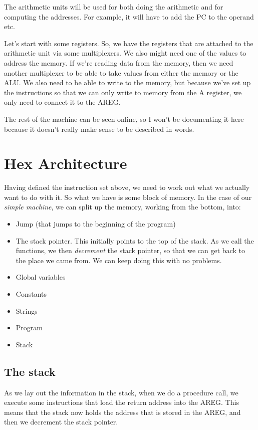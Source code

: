 \documentclass[11pt,a4paper,titlepage,dvipsnames,cmyk]{scrartcl}
\begin{document}
The arithmetic units will be used for both doing the arithmetic and for
computing the addresses. For example, it will have to add the PC to the
operand etc.

Let's start with some registers. So, we have the registers that are
attached to the arithmetic unit via some multiplexers. We also might need
one of the values to address the memory. If we're reading data from the
memory, then we need another multiplexer to be able to take values from
either the memory or the ALU. We also need to be able to write to the
memory, but because we've set up the instructions so that we can only
write to memory from the A register, we only need to connect it to the
AREG.

The rest of the machine can be seen online, so I won't be documenting it
here because it doesn't really make sense to be described in words.

\section{Hex Architecture}%
\label{sec:Hex Architecture}
Having defined the instruction set above, we need to work out what we
actually want to do with it. So what we have is some block of memory. In
the case of our \textit{simple machine}, we can split up the memory,
working from the bottom, into:
\begin{itemize}
    \item Jump (that jumps to the beginning of the program)
    \item The stack pointer. This initially points to the top of the
        stack. As we call the functions, we then \textit{decrement} the
        stack pointer, so that we can get back to the place we came from.
        We can keep doing this with no problems.
    \item Global variables
    \item Constants
    \item Strings
    \item Program
    \item Stack
\end{itemize}

\subsection{The stack}%
\label{sub:the-stack}
As we lay out the information in the stack, when we do a procedure call,
we execute some instructions that load the return address into the AREG.
This means that the stack now holds the address that is stored in the
AREG, and then we decrement the stack pointer.
\end{document}

